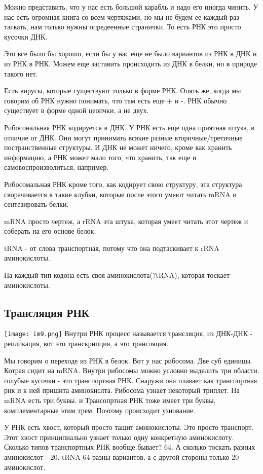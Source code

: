 Можно представить, что у нас есть большой карабль и надо его 
иногда чинить. У нас есть огромная книга со всем чертяжами, 
но мы не будем ее каждый раз таскать, нам только нужны опредеенные странички. 
То есть РНК это просто кусочки ДНК. 

Это все было бы хорошо, если бы у нас 
еще не было вариантов из РНК в ДНК и из РНК в РНК. Можем
еще заставить происходить из ДНК в белки, но в природе такого нет.

Есть вирусы, которые существуют только в форме РНК. Опять же,
когда мы говорим об РНК нужно понимать, что там есть еще + и -. РНК
обычно существует в форме одной цеопчки, а не двух.

Рибосональная РНК кодируется в ДНК. У РНК есть
еще одна приятная штука, в отличие от ДНК. Они могут
принимать всякие разные вторичные/третичные постранственные структуры.
И ДНК не может ничего, кроме как хранить информацию, а РНК может
мало того, что хранить, так еще и самовоспроизволиться, например.

Рибосомальная РНК кроме того, как кодирует свою структуру, эта структура 
сворачивается в такие клубки, которые после этого умеют 
читать mRNA и сентезировать белки.

mRNA просто чертеж, а rRNA эта штука, которая умеет читать этот чертеж и соберать
на его основе белок.

tRNA - от слова транспортная, потому что она подтаскивает к rRNA аминокислоты.

На каждый тип кодона есть своя аминокислота(?tRNA), которая тоскает аминокислоты. 

\subsection{Трансляция РНК}
\texttt{[image: im9.png]}
Внутри РНК процесс называется трансляция, из ДНК-ДНК - репликация, 
вот это транскрипция, а это трансляция.

Мы говорим о переходе из РНК в белок. Вот у нас рибосома. Две суб единицы.
Котрая сидит на mRNA. Внутри рибосомы можно условно выделить
три области. голубые кусочки - это транспортная РНК. Снаружи она плавает
как транспортная рнк и к ней пришита аминокислта. Рибосома узнает
некоторый триплет. На mRNA есть три буквы. и Трансопртная РНК тоже имеет
три буквы, комплементарные этим трем. Поэтому происходит узнование.

У РНК есть хвост, который просто тащит аминокислоты. Это просто транспорт. Этот
хвост принципиально узнает только одну конкретную аминокислоту. Сколько типов
транспортных РНК вообще бывает? 64. А сколько тоскать разных аминокислот - 20.
tRNA 64 разны вариантов, а с другой стороны только 20 аминокислот.

